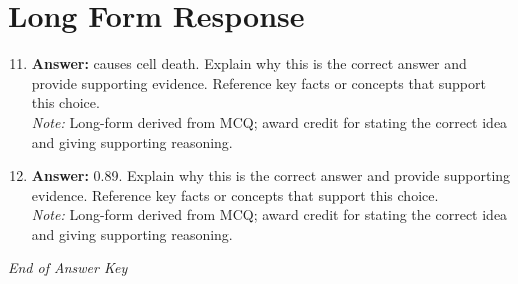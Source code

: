 \documentclass[12pt]{article}
\begin{document}
\section*{Long Form Response}
\begin{enumerate}[label=\arabic*.]
\setcounter{enumi}{10}
\item \textbf{Answer:} causes cell death. Explain why this is the correct answer and provide supporting evidence. Reference key facts or concepts that support this choice.
\\ \textit{Note:} Long-form derived from MCQ; award credit for stating the correct idea and giving supporting reasoning.
\item \textbf{Answer:} 0.89. Explain why this is the correct answer and provide supporting evidence. Reference key facts or concepts that support this choice.
\\ \textit{Note:} Long-form derived from MCQ; award credit for stating the correct idea and giving supporting reasoning.
\end{enumerate}

\vfill
\noindent\textit{End of Answer Key}
\end{document}

